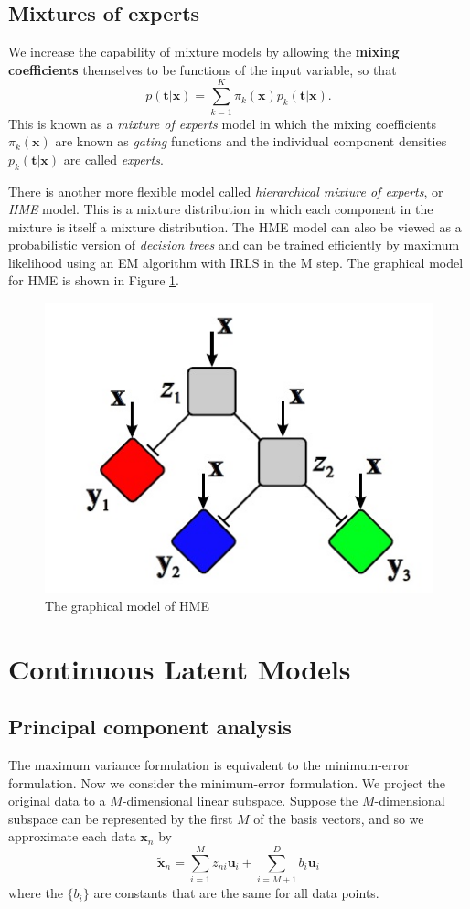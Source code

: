 \documentclass[a4paper]{book}
\renewcommand{\bf}{\mathbf}
\newcommand{\imp}[1]{\textit{#1}}
\begin{document}
\subsection{Mixtures of experts}
We increase the capability of mixture models by allowing the \textbf{mixing coefficients} themselves to be functions of the input variable, so that
\begin{equation}
	p(\bf{t|x}) = \sum_{k=1}^K \pi_k(\bf{x})p_k(\bf{t|x}).
\end{equation}
This is known as a \imp{mixture of experts} model in which the mixing coefficients $\pi_k(\bf{x})$ are known as \imp{gating} functions and the individual component densities $p_k(\bf{t|x})$ are called \imp{experts}.

There is another more flexible model called \imp{hierarchical mixture of experts}, or \imp{HME} model. This is a mixture distribution in which each component in the mixture is itself a mixture distribution. The HME model can also be viewed as a probabilistic version of \imp{decision trees} and can be trained efficiently by maximum likelihood using an EM algorithm with IRLS in the M step. The graphical model for HME is shown in Figure \ref{HME}.
\begin{figure}
\centering
\includegraphics[scale = 0.5]{HME}
\caption{The graphical model of HME}\label{HME}
\end{figure}
\section{Continuous Latent Models}
\subsection{Principal component analysis}
The maximum variance formulation is equivalent to the minimum-error formulation. Now we consider the minimum-error formulation. We project the original data to a $M$-dimensional linear subspace. Suppose the $M$-dimensional subspace can be represented by the first $M$ of the basis vectors, and so we approximate each data $\bf{x}_n$ by
\begin{equation}
	\tilde{\bf{x}}_{n} = \sum_{i=1}^M z_{ni}\bf{u}_i  + \sum_{i=M+1}^D b_i \bf{u}_i
\end{equation}
where the $\{b_i \}$ are constants that are the same for all data points.
\end{document}
